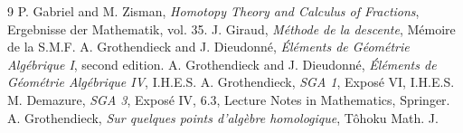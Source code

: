 \documentclass[11pt]{article}
\begin{document}
\begin{thebibliography}{9}
 P. Gabriel and M. Zisman, \emph{Homotopy Theory and Calculus of Fractions}, Ergebnisse der Mathematik, vol. 35.
 J. Giraud, \emph{M\'ethode de la descente}, M\'emoire de la S.M.F.
 A. Grothendieck and J. Dieudonn\'e, \emph{\'El\'ements de G\'eom\'etrie Alg\'ebrique I}, second edition.
 A. Grothendieck and J. Dieudonn\'e, \emph{\'El\'ements de G\'eom\'etrie Alg\'ebrique IV}, I.H.E.S.
 A. Grothendieck, \emph{SGA 1}, Expos\'e VI, I.H.E.S.
 M. Demazure, \emph{SGA 3}, Expos\'e IV, 6.3, Lecture Notes in Mathematics, Springer.
 A. Grothendieck, \emph{Sur quelques points d'alg\`ebre homologique}, T\^ohoku Math. J.
\end{thebibliography}
\end{document}
